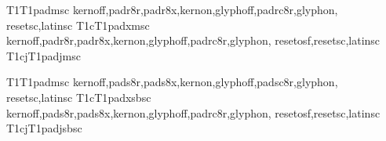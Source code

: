

 {}
 {}

\installfonts

 {}

            {T1}{T1}{pad}{m}{sc}{}
            {kernoff,padr8r,padr8x,kernon,glyphoff,padrc8r,glyphon,
             resetsc,latinsc}
            {T1c}{T1}{padx}{m}{sc}{}
            {kernoff,padr8r,padr8x,kernon,glyphoff,padrc8r,glyphon,
             resetosf,resetsc,latinsc}
            {T1cj}{T1}{padj}{m}{sc}{}

            {T1}{T1}{pad}{m}{sc}{}
            {kernoff,pads8r,pads8x,kernon,glyphoff,padsc8r,glyphon,
             resetsc,latinsc}
            {T1c}{T1}{padx}{sb}{sc}{}
            {kernoff,pads8r,pads8x,kernon,glyphoff,padrc8r,glyphon,
             resetosf,resetsc,latinsc}
            {T1cj}{T1}{padj}{sb}{sc}{}

\endinstallfonts
\bye


